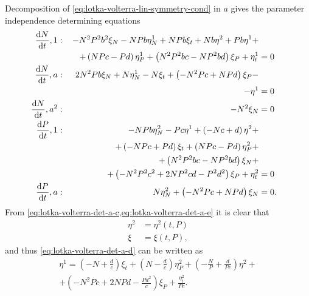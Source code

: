 Decomposition of \cref{eq:lotka-volterra-lin-symmetry-cond} in \(a\) gives the parameter independence determining equations
\begin{subequations}\label{eq:lotka-volterra-det-a}
  \begin{flalign}
    \diff{N}{t}, 1 & : & - N^{2} P^{2} b^{2} \xi_{N} - N P b \eta^1_{N} + N P b \xi_{t} + N b \eta^{2} + P b \eta^{1} +&&\\
    &&\quad+ \left(N P c - P d\right) \eta^1_{P} + \left(N^{2} P^{2} b c - N P^{2} b d\right) \xi_{P} + \eta^1_{t} &= 0 &\label{eq:lotka-volterra-det-a-a}\\
    \diff{N}{t}, a & : & 2 N^{2} P b \xi_{N} + N \eta^1_{N} - N \xi_{t} + \left(- N^{2} P c + N P d\right) \xi_{P} -&&\\
    &&\quad- \eta^{1} &= 0 &\label{eq:lotka-volterra-det-a-b}\\
    \diff{N}{t}, a^2 & : & - N^{2} \xi_{N} &= 0 &\label{eq:lotka-volterra-det-a-c}\\
    \diff{P}{t}, 1 & : & - N P b \eta^2_{N} - P c \eta^{1} + \left(- N c + d\right) \eta^{2} +&&\\
    &&\quad+  \left(- N P c + P d\right) \xi_{t} + \left(N P c - P d\right) \eta^2_{P} +&&\\
    &&\quad+ \left(N^{2} P^{2} b c - N P^{2} b d\right) \xi_{N} +&&\\
    &&\quad+ \left(- N^{2} P^{2} c^{2} + 2 N P^{2} c d - P^{2} d^{2}\right) \xi_{P} + \eta^2_{t} &= 0 &\label{eq:lotka-volterra-det-a-d}\\
    \diff{P}{t}, a & : & N \eta^2_{N} + \left(- N^{2} P c + N P d\right) \xi_{N} &= 0. &\label{eq:lotka-volterra-det-a-e}
  \end{flalign}
\end{subequations}
From \cref{eq:lotka-volterra-det-a-c,eq:lotka-volterra-det-a-e} it is clear that
\begin{subequations} \label{eq:lotka-volterra-a-first-simplification}
  \begin{align}
    \eta^2 &= \eta^2(t, P)\\
    \xi &= \xi(t, P),
  \end{align}
\end{subequations}
and thus \cref{eq:lotka-volterra-det-a-d} can be written as
\begin{multline*}
  \eta^{1} = \left(- N + \frac{d}{c}\right) \xi_{t} + \left(N - \frac{d}{c}\right) \eta^2_{P} + \left(- \frac{N}{P} + \frac{d}{P c}\right) \eta^{2} +\\
  + \left(- N^{2} P c + 2 N P d - \frac{P d^{2}}{c}\right) \xi_{P} + \frac{\eta^2_{t}}{P c}.
\end{multline*}
